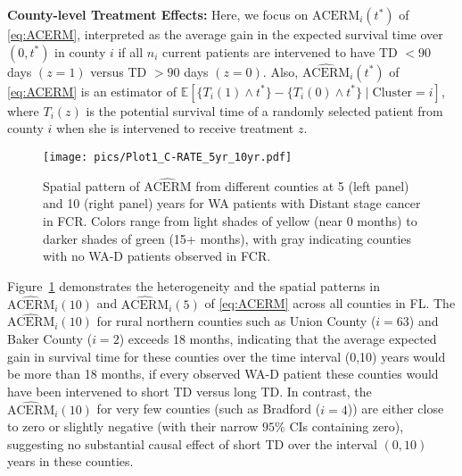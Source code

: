 \documentclass[aoas]{imsart}
\theoremstyle{plain}
\theoremstyle{definition}
\begin{document}
\textbf{County-level Treatment Effects:}
Here, we focus on $\text{ACERM}_i(t^*)$ of \eqref{eq:ACERM}, interpreted as the average gain in the expected survival time over $(0,t^*)$ in county $i$ if all $n_i$ current patients are intervened to have TD $<90$ days $(z=1)$ versus TD $>90$ days $(z=0)$. Also, $\widehat{\text{ACERM}}_i(t^*)$ of \eqref{eq:ACERM} is an estimator of $\mathbb{E}[\{T_i(1) \wedge t^*\} - \{T_i(0) \wedge t^*\} \mid \text{Cluster}=i]$, where $T_i(z)$ is the potential survival time of a randomly selected patient from county $i$ when she is intervened to receive treatment $z$. 
\begin{figure}[ht]
\centering
\texttt{[image: pics/Plot1\_C-RATE\_5yr\_10yr.pdf]}
\caption{Spatial pattern of  $\widehat{\text{ACERM}}$ from different counties at 5 (left panel) and 10 (right panel) years for  WA patients with Distant stage cancer in FCR. Colors range from light shades of yellow (near 0 months) to darker shades of green (15+ months), with gray indicating counties with no WA-D patients observed in FCR.}
\label{fig:county_ate}
\end{figure}
Figure~\ref{fig:county_ate} demonstrates the heterogeneity and the spatial patterns in $\widehat{\text{ACERM}}_i(10)$ and $\widehat{\text{ACERM}}_i(5)$ of \eqref{eq:ACERM} across all counties in FL. The $\widehat{\text{ACERM}}_i(10)$ for rural northern counties such as Union County ($i=63$) and Baker County ($i=2$) exceeds 18 months, indicating that the average expected gain in survival time for these counties over the time interval (0,10) years would be more than 18 months, if every observed WA-D patient these counties would have been intervened to short TD versus long TD. 
In contrast, the $\widehat{\text{ACERM}}_i(10)$ for very few counties (such as Bradford ($i=4$)) are either close to zero or slightly negative (with their narrow $95\%$ CIs containing zero), suggesting no substantial causal effect of short TD over the interval $(0,10)$ years in these counties. 
\end{document}
